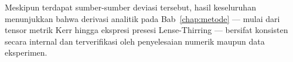 Meskipun terdapat sumber-sumber deviasi tersebut,
hasil keseluruhan menunjukkan bahwa derivasi analitik
pada Bab~\ref{chap:metode} --- mulai dari tensor metrik Kerr
hingga ekspresi presesi Lense-Thirring ---
bersifat konsisten secara internal dan terverifikasi
oleh penyelesaian numerik maupun data eksperimen.
